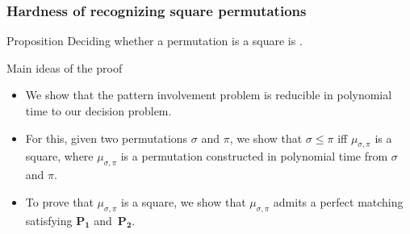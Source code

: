 \documentclass[unknownkeysallowed,10pt,xcolor={dvipsnames}]{beamer}
\begin{document}

\begin{frame}
  \frametitle{Hardness of recognizing square permutations}

  \begin{block}{Proposition}
    Deciding whether a permutation is a square is \NPC.
  \end{block}

  \medskip

  \begin{block}{Main ideas of the proof}
    \begin{itemize}
        \item We show that the pattern involvement problem is reducible
        in polynomial time to our decision problem.
        \medskip

        \item For this, given two permutations $\sigma$ and $\pi$, we
        show that $\sigma \leq \pi$ iff $\mu_{\sigma, \pi}$ is a square,
        where $\mu_{\sigma, \pi}$ is a permutation constructed in polynomial
        time from $\sigma$ and $\pi$.
        \medskip

        \item To prove that $\mu_{\sigma, \pi}$ is a square, we show
        that $\mu_{\sigma, \pi}$ admits a perfect matching satisfying
        $\mathbf{P_1}$ and~$\mathbf{P_2}$.

    \end{itemize}
  \end{block}
\end{frame}

\end{document}
